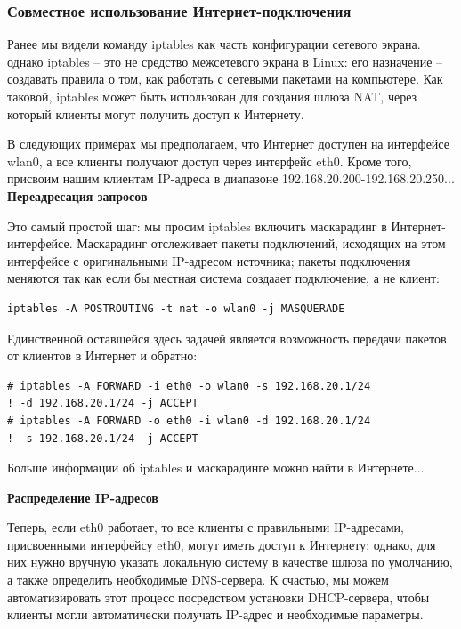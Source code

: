 \documentclass[10pt]{book}
\begin{document}
\subsubsection{Совместное использование Интернет-подключения}

Ранее мы видели команду iptables как часть конфигурации сетевого экрана. однако iptables -- это не средство межсетевого экрана в Linux: его назначение -- создавать правила о том, как работать с сетевыми пакетами на компьютере. Как таковой, iptables может быть использован для создания шлюза NAT, через который клиенты могут получить доступ к Интернету.

В следующих примерах мы предполагаем, что Интернет доступен на интерфейсе wlan0, а все клиенты получают доступ через интерфейс eth0. Кроме того, присвоим нашим клиентам IP-адреса в диапазоне 192.168.20.200-192.168.20.250...\\

\textbf{Переадресация запросов}

Это самый простой шаг: мы просим iptables включить маскарадинг в Интернет-интерфейсе.
Маскарадинг отслеживает пакеты подключений, исходящих на этом интерфейсе с оригинальными IP-адресом источника; пакеты подключения меняются так как если бы  местная система создаает подключение, а не клиент:

\begin{tcolorbox}
\begin{lstlisting}
iptables -A POSTROUTING -t nat -o wlan0 -j MASQUERADE
\end{lstlisting}
\end{tcolorbox}

Единственной оставшейся здесь задачей является возможность передачи пакетов от клиентов в Интернет и обратно:

\begin{tcolorbox}
\begin{lstlisting}
# iptables -A FORWARD -i eth0 -o wlan0 -s 192.168.20.1/24
! -d 192.168.20.1/24 -j ACCEPT
# iptables -A FORWARD -o eth0 -i wlan0 -d 192.168.20.1/24
! -s 192.168.20.1/24 -j ACCEPT
\end{lstlisting}
\end{tcolorbox}

Больше информации об iptables и маскарадинге можно найти в Интернете...

\textbf{Распределение IP-адресов}

Теперь, если eth0 работает, то все клиенты с правильными IP-адресами, присвоенными интерфейсу eth0, могут иметь доступ к Интернету; однако, для них нужно вручную указать локальную систему в качестве шлюза по умолчанию, а также определить необходимые DNS-сервера. К счастью, мы можем автоматизировать этот процесс посредством установки DHCP-сервера, чтобы клиенты могли автоматически получать IP-адрес и необходимые параметры.
\end{document}
